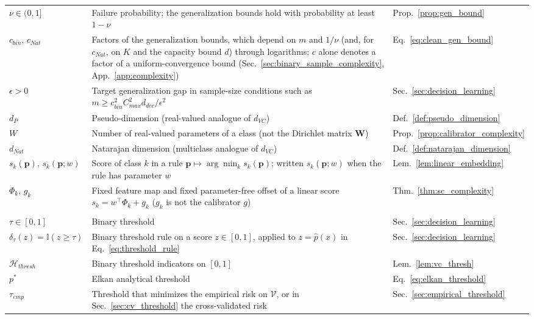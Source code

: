 {\begin{longtable}{@{}l >{\raggedright\arraybackslash}p{8cm} l@{}}
$\nu \in (0, 1]$ & Failure probability; the generalization bounds hold with probability at least $1 - \nu$ & Prop.~\ref{prop:gen_bound} \\
$c_{bin}$, $c_{Nat}$ & Factors of the generalization bounds, which depend on $m$ and $1/\nu$ (and, for $c_{Nat}$, on $K$ and the capacity bound $d$) through logarithms; $c$ alone denotes a factor of a uniform-convergence bound (Sec.~\ref{sec:binary_sample_complexity}, App.~\ref{app:complexity}) & Eq.~\eqref{eq:clean_gen_bound} \\
$\epsilon > 0$ & Target generalization gap in sample-size conditions such as $m \geq c_{bin}^2 C_{max}^2 d_{dec} / \epsilon^2$ & Sec.~\ref{sec:decision_learning} \\
$d_P$ & Pseudo-dimension (real-valued analogue of $d_{VC}$) & Def.~\ref{def:pseudo_dimension} \\
$W$ & Number of real-valued parameters of a class (not the Dirichlet matrix $\mathbf{W}$) & Prop.~\ref{prop:calibrator_complexity} \\
$d_{Nat}$ & Natarajan dimension (multiclass analogue of $d_{VC}$) & Def.~\ref{def:natarajan_dimension} \\
$s_k(\mathbf{p})$, $s_k(\mathbf{p}; w)$ & Score of class $k$ in a rule $\mathbf{p} \mapsto \arg\min_k s_k(\mathbf{p})$; written $s_k(\mathbf{p}; w)$ when the rule has parameter $w$ & Lem.~\ref{lem:linear_embedding} \\
$\Phi_k$, $g_k$ & Fixed feature map and fixed parameter-free offset of a linear score $s_k = w^\top \Phi_k + g_k$ ($g_k$ is not the calibrator $g$) & Thm.~\ref{thm:sc_complexity} \\
\addlinespace
\multicolumn{3}{@{}l}{\textit{Binary thresholds}}\\
\midrule
$\tau \in [0,1]$ & Binary threshold & Sec.~\ref{sec:decision_learning} \\
$\delta_\tau(z) = \mathbb{I}(z \geq \tau)$ & Binary threshold rule on a score $z \in [0,1]$, applied to $z = \hat p(x)$ in Eq.~\eqref{eq:threshold_rule} & Sec.~\ref{sec:decision_learning} \\
$\mathcal{H}_{thresh}$ & Binary threshold indicators on $[0,1]$ & Lem.~\ref{lem:vc_thresh} \\
$p^*$ & Elkan analytical threshold & Eq.~\eqref{eq:elkan_threshold} \\
$\tau_{emp}$ & Threshold that minimizes the empirical risk on $\mathcal{V}$, or in Sec.~\ref{sec:cv_threshold} the cross-validated risk & Sec.~\ref{sec:empirical_threshold} \\

\end{longtable}}
